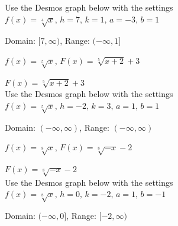 \documentclass{ximera}
\begin{document}
\begin{question}
\begin {problem}
\begin{solution}
Use the Desmos graph below with the settings $f(x)=\sqrt[4]{x},\,h=7,\,k=1,\,a=-3,\,b=1$

\begin{center} 
\end{center}

Domain:  $[7, \infty)$, Range: $(-\infty, 1]$

\end{solution}
\end {problem}

\begin {problem}
$f(x) = \sqrt[5]{x}$, $F(x) = \sqrt[5]{x + 2} + 3$
\begin{solution}
$F(x) = \sqrt[5]{x + 2} + 3$\\

Use the Desmos graph below with the settings $f(x)=\sqrt[5]{x},\,h=-2,\,k=3,\,a=1,\,b=1$

\begin{center} 
\end{center}

Domain:  $(-\infty, \infty)$, Range: $(-\infty, \infty)$

\end{solution}

\end {problem}

\begin {problem} \label{radicalgraphexlast}
$f(x) = \sqrt[8]{x}$, $F(x) = \sqrt[8]{-x} - 2$ 
\begin{solution}
$F(x) = \sqrt[8]{-x} - 2$\\

Use the Desmos graph below with the settings $f(x)=\sqrt[8]{x},\,h=0,\,k=-2,\,a=1,\,b=-1$

\begin{center} 
\end{center}

Domain:  $(-\infty, 0]$, Range: $[-2, \infty)$
\end{solution}
\end {problem}
\end{question}
\end{document}

